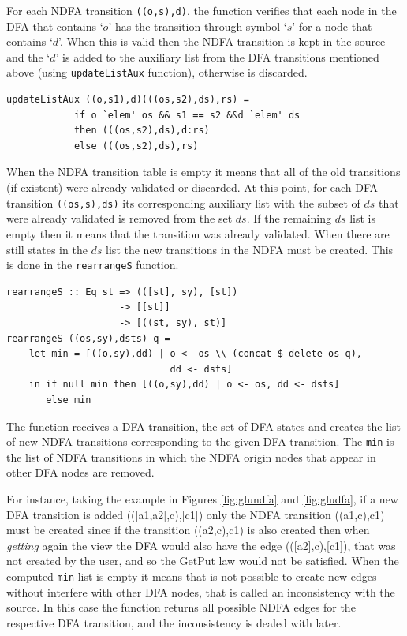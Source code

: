 \vspace{5mm}
For each NDFA transition \texttt{((o,s),d)}, the function verifies that each node in the DFA that contains `$o$' has the transition through symbol `$s$' for a node that contains `$d$'. When this is valid then the NDFA transition is kept in the source and the `$d$' is added to the auxiliary list from the DFA transitions mentioned above (using \texttt{updateListAux} function), otherwise is discarded. 

\begin{verbatim}
updateListAux ((o,s1),d)(((os,s2),ds),rs) = 
            if o `elem' os && s1 == s2 &&d `elem' ds
            then (((os,s2),ds),d:rs)
            else (((os,s2),ds),rs)
\end{verbatim}

When the NDFA transition table is empty it means that all of the old transitions (if existent) were already validated or discarded. At this point, for each DFA transition \texttt{((os,s),ds)} its corresponding auxiliary list with the subset of $ds$ that were already validated is removed from the set $ds$. If the remaining $ds$ list is empty then it means that the transition was already validated. When there are still states in the $ds$ list the new transitions in the NDFA must be created. This is done in the \texttt{rearrangeS} function. 

\begin{verbatim}
rearrangeS :: Eq st => (([st], sy), [st])
                    -> [[st]] 
                    -> [((st, sy), st)]
rearrangeS ((os,sy),dsts) q = 
    let min = [((o,sy),dd) | o <- os \\ (concat $ delete os q), 
                             dd <- dsts]
    in if null min then [((o,sy),dd) | o <- os, dd <- dsts]
       else min 
\end{verbatim}

The function receives a DFA transition, the set of DFA states and creates the list of new NDFA transitions corresponding to the given DFA transition. The \texttt{min} is the list of NDFA transitions in which the NDFA origin nodes that appear in other DFA nodes are removed. 

For instance, taking the example in Figures \ref{fig:glundfa} and \ref{fig:gludfa}, if a new DFA transition is added (([a1,a2],c),[c1]) only the NDFA transition ((a1,c),c1) must be created since if the transition ((a2,c),c1) is also created then when \textit{getting} again the view the DFA would also have the edge (([a2],c),[c1]), that was not created by the user, and so the GetPut law would not be satisfied. When the computed \texttt{min} list is empty it means that is not possible to create new edges without interfere with other DFA nodes, that is called an inconsistency with the source. In this case the function returns all possible NDFA edges for the respective DFA transition, and the inconsistency is dealed with later. 

